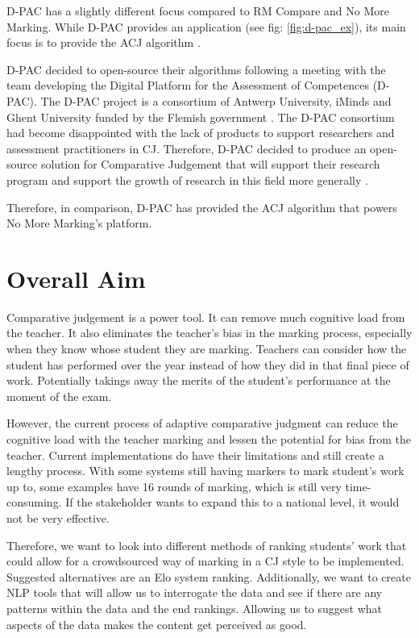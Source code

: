 		D-PAC has a slightly different focus compared to RM Compare and No More Marking. While D-PAC provides an application (see fig: \ref{fig:d-pac_ex}), its main focus is to provide the ACJ algorithm \cite{d-pac_blog,d-pac_gh}.
		
		D-PAC decided to open-source their algorithms following a meeting with the team developing the Digital Platform for the Assessment of Competences (D-PAC). The D-PAC project is a consortium of Antwerp University, iMinds and Ghent University funded by the Flemish government \cite{d-pac_blog}. The D-PAC consortium had become disappointed with the lack of products to support researchers and assessment practitioners in CJ. Therefore, D-PAC decided to produce an open-source solution for Comparative Judgement that will support their research program and support the growth of research in this field more generally \cite{d-pac_blog}.
		
		Therefore, in comparison, D-PAC has provided the ACJ algorithm that powers No More Marking's platform.

	
	\section{Overall Aim}
		Comparative judgement is a power tool. It can remove much cognitive load from the teacher. It also eliminates the teacher's bias in the marking process, especially when they know whose student they are marking. Teachers can consider how the student has performed over the year instead of how they did in that final piece of work. Potentially takings away the merits of the student's performance at the moment of the exam.
		
		However, the current process of adaptive comparative judgment can reduce the cognitive load with the teacher marking and lessen the potential for bias from the teacher. Current implementations do have their limitations and still create a lengthy process. With some systems still having markers to mark student's work up to, some examples have 16 rounds of marking, which is still very time-consuming. If the stakeholder wants to expand this to a national level, it would not be very effective.
		
		Therefore, we want to look into different methods of ranking students' work that could allow for a crowdsourced way of marking in a CJ style to be implemented. Suggested alternatives are an Elo system ranking. Additionally, we want to create NLP tools that will allow us to interrogate the data and see if there are any patterns within the data and the end rankings. Allowing us to suggest what aspects of the data makes the content get perceived as good.
